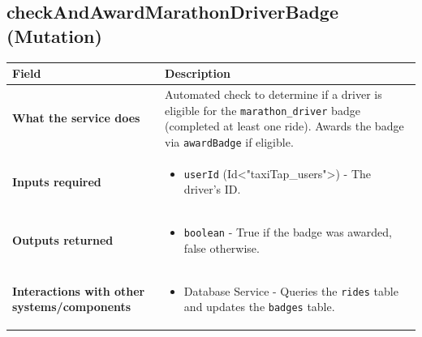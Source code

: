 \documentclass[11pt,a4paper]{article}
\begin{document}
\subsection{checkAndAwardMarathonDriverBadge (Mutation)}
\label{sub:checkAndAwardMarathonDriverBadge}
\begin{longtable}{|p{4cm}|p{12cm}|}
\hline
\textbf{Field} & \textbf{Description} \\
\hline
\textbf{What the service does} & 
Automated check to determine if a driver is eligible for the \texttt{marathon\_driver} badge (completed at least one ride). Awards the badge via \texttt{awardBadge} if eligible. \\
\hline
\textbf{Inputs required} & 
\begin{itemize}[nosep]
\item \texttt{userId} (Id<"taxiTap\_users">) - The driver's ID.
\end{itemize} \\
\hline
\textbf{Outputs returned} & 
\begin{itemize}[nosep]
\item \texttt{boolean} - True if the badge was awarded, false otherwise.
\end{itemize} \\
\hline
\textbf{Interactions with other systems/components} & 
\begin{itemize}[nosep]
\item Database Service - Queries the \texttt{rides} table and updates the \texttt{badges} table.
\end{itemize} \\
\hline
\end{longtable}
\end{document}
